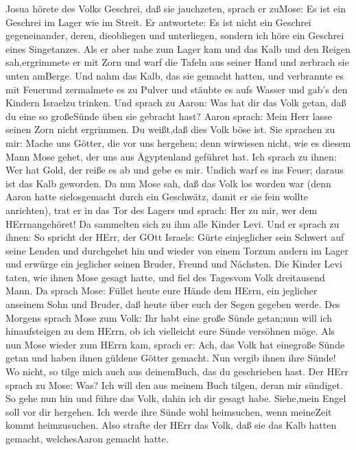 Josua hörete des Volks Geschrei, daß sie jauchzeten, sprach er zuMose:
Es ist ein Geschrei im Lager wie im Streit.  Er antwortete:
Es ist nicht ein Geschrei gegeneinander, deren, dieobliegen und
unterliegen, sondern ich höre ein Geschrei eines Singetanzes.
 Als er aber nahe zum Lager kam und das Kalb und den Reigen
sah,ergrimmete er mit Zorn und warf die Tafeln aus seiner Hand und
zerbrach sie unten amBerge.  Und nahm das Kalb, das sie
gemacht hatten, und verbrannte es mit Feuerund zermalmete es zu Pulver
und stäubte es aufs Wasser und gab's den Kindern Israelzu trinken.
 Und sprach zu Aaron: Was hat dir das Volk getan, daß du
eine so großeSünde üben sie gebracht hast?  Aaron sprach:
Mein Herr lasse seinen Zorn nicht ergrimmen. Du weißt,daß dies Volk böse
ist.  Sie sprachen zu mir: Mache uns Götter, die vor uns
hergehen; denn wirwissen nicht, wie es diesem Mann Mose gehet, der uns
aus Ägyptenland geführet hat.  Ich sprach zu ihnen: Wer hat
Gold, der reiße es ab und gebe es mir. Undich warf es ins Feuer; daraus
ist das Kalb geworden.  Da nun Mose sah, daß das Volk los
worden war (denn Aaron hatte sielosgemacht durch ein Geschwätz, damit er
sie fein wollte anrichten),  trat er in das Tor des Lagers
und sprach: Her zu mir, wer dem HErrnangehöret! Da sammelten sich zu ihm
alle Kinder Levi.  Und er sprach zu ihnen: So spricht der
HErr, der GOtt Israels: Gürte einjeglicher sein Schwert auf seine Lenden
und durchgehet hin und wieder von einem Torzum andern im Lager und
erwürge ein jeglicher seinen Bruder, Freund und Nächsten. 
Die Kinder Levi taten, wie ihnen Mose gesagt hatte, und fiel des
Tagesvom Volk dreitausend Mann.  Da sprach Mose: Füllet
heute eure Hände dem HErrn, ein jeglicher anseinem Sohn und Bruder, daß
heute über euch der Segen gegeben werde.  Des Morgens
sprach Mose zum Volk: Ihr habt eine große Sünde getan;nun will ich
hinaufsteigen zu dem HErrn, ob ich vielleicht eure Sünde versöhnen möge.
 Als nun Mose wieder zum HErrn kam, sprach er: Ach, das
Volk hat einegroße Sünde getan und haben ihnen güldene Götter gemacht.
 Nun vergib ihnen ihre Sünde! Wo nicht, so tilge mich auch
aus deinemBuch, das du geschrieben hast.  Der HErr sprach
zu Mose: Was? Ich will den aus meinem Buch tilgen, deran mir sündiget.
 So gehe nun hin und führe das Volk, dahin ich dir gesagt
habe. Siehe,mein Engel soll vor dir hergehen. Ich werde ihre Sünde wohl
heimsuchen, wenn meineZeit kommt heimzusuchen.  Also
strafte der HErr das Volk, daß sie das Kalb hatten gemacht, welchesAaron
gemacht hatte.

